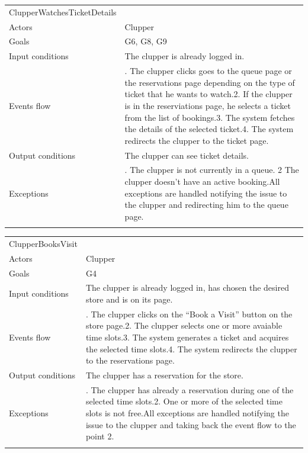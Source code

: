 \documentclass[
]{article}
\begin{document}
\begin{longtable}[]{@{}
  >{\raggedright\arraybackslash}p{}
  >{\raggedright\arraybackslash}p{}@{}}
\toprule
ClupperWatchesTicketDetails & \\ \addlinespace
\midrule
\endhead
Actors & Clupper \\ \addlinespace
Goals & G6, G8, G9 \\ \addlinespace
Input conditions & The clupper is already logged in. \\ \addlinespace
Events flow & 1. The clupper clicks goes to the queue page or the
reservations page depending on the type of ticket that he wants to
watch.2. If the clupper is in the reserviations page, he selects a
ticket from the list of bookings.3. The system fetches the details of
the selected ticket.4. The system redirects the clupper to the ticket
page. \\ \addlinespace
Output conditions & The clupper can see ticket details. \\ \addlinespace
Exceptions & 1. The clupper is not currently in a queue. 2 The clupper
doesn't have an active booking.All exceptions are handled notifying the
issue to the clupper and redirecting him to the queue
page. \\ \addlinespace
\bottomrule
\end{longtable}

\begin{longtable}[]{@{}
  >{\raggedright\arraybackslash}p{}
  >{\raggedright\arraybackslash}p{}@{}}
\toprule
ClupperBooksVisit & \\ \addlinespace
\midrule
\endhead
Actors & Clupper \\ \addlinespace
Goals & G4 \\ \addlinespace
Input conditions & The clupper is already logged in, has chosen the
desired store and is on its page. \\ \addlinespace
Events flow & 1. The clupper clicks on the ``Book a Visit'' button on
the store page.2. The clupper selects one or more avaiable time slots.3.
The system generates a ticket and acquires the selected time slots.4.
The system redirects the clupper to the reservations
page. \\ \addlinespace
Output conditions & The clupper has a reservation for the
store. \\ \addlinespace
Exceptions & 1. The clupper has already a reservation during one of the
selected time slots.2. One or more of the selected time slots is not
free.All exceptions are handled notifying the issue to the clupper and
taking back the event flow to the point 2. \\ \addlinespace
\bottomrule
\end{longtable}
\end{document}
